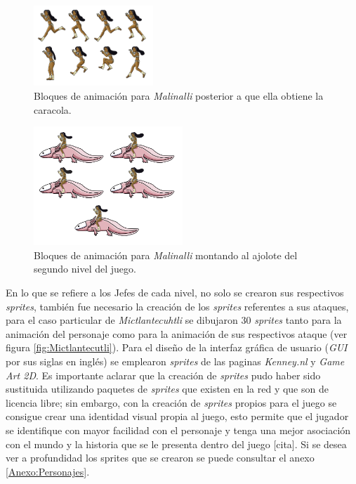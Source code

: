\begin{figure}[h]
    \centering
    \includegraphics[width=0.4\textwidth]{03TrabajoRealizado/imagenes/MalinalliArma.png}
     \caption{Bloques de animación para \textit{Malinalli} posterior a que ella obtiene la caracola.}
    \label{fig:MalinalliCaracola}        
\end{figure}

\begin{figure}[h]
    \centering
    \includegraphics[width=0.5\textwidth]{03TrabajoRealizado/imagenes/MalinaliAjolote.png}
     \caption{Bloques de animación para \textit{Malinalli} montando al ajolote del segundo nivel del juego.}
    \label{fig:MalinalliAjolote}        
\end{figure}

En lo que se refiere a los Jefes de cada nivel, no solo se crearon sus
respectivos \textit{sprites}, también fue necesario la creación de los
\textit{sprites} referentes a sus ataques, para el caso particular de
\textit{Mictlantecuhtli} se dibujaron 30 \textit{sprites} tanto para la animación
del personaje como para la animación de sus respectivos ataque (ver figura
\ref{fig:Mictlantecutli}). Para el diseño de la interfaz gráfica de usuario
(\textit{GUI} por sus siglas en inglés) se emplearon \textit{sprites} de las
paginas \textit{Kenney.nl} y \textit{Game Art 2D}. Es importante aclarar que la
creación de \textit{sprites} pudo haber sido sustituida utilizando paquetes de
\textit{sprites} que existen en la red y que son de licencia libre; sin embargo,
con la creación de \textit{sprites} propios para el juego se consigue crear una
identidad visual propia al juego, esto permite que el jugador se identifique con
mayor facilidad con el personaje y tenga una mejor asociación con el mundo y la
historia que se le presenta dentro del juego [cita]. Si se desea ver a profundidad
los {sprites} que se crearon se puede consultar el anexo \ref{Anexo:Personajes}.

